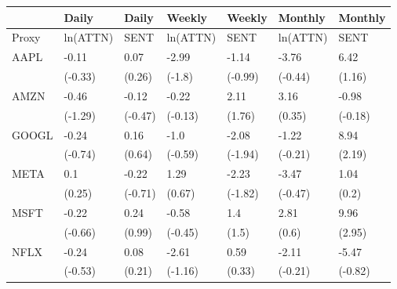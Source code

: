 \begin{tabular}{lllllll}
\toprule
{} &     Daily &    Daily &    Weekly &   Weekly &   Monthly &  Monthly \\
\midrule
Proxy &  ln(ATTN) &     SENT &  ln(ATTN) &     SENT &  ln(ATTN) &     SENT \\
AAPL  &     -0.11 &     0.07 &     -2.99 &    -1.14 &     -3.76 &     6.42 \\
      &   (-0.33) &   (0.26) &    (-1.8) &  (-0.99) &   (-0.44) &   (1.16) \\
AMZN  &     -0.46 &    -0.12 &     -0.22 &     2.11 &      3.16 &    -0.98 \\
      &   (-1.29) &  (-0.47) &   (-0.13) &   (1.76) &    (0.35) &  (-0.18) \\
GOOGL &     -0.24 &     0.16 &      -1.0 &    -2.08 &     -1.22 &     8.94 \\
      &   (-0.74) &   (0.64) &   (-0.59) &  (-1.94) &   (-0.21) &   (2.19) \\
META  &       0.1 &    -0.22 &      1.29 &    -2.23 &     -3.47 &     1.04 \\
      &    (0.25) &  (-0.71) &    (0.67) &  (-1.82) &   (-0.47) &    (0.2) \\
MSFT  &     -0.22 &     0.24 &     -0.58 &      1.4 &      2.81 &     9.96 \\
      &   (-0.66) &   (0.99) &   (-0.45) &    (1.5) &     (0.6) &   (2.95) \\
NFLX  &     -0.24 &     0.08 &     -2.61 &     0.59 &     -2.11 &    -5.47 \\
      &   (-0.53) &   (0.21) &   (-1.16) &   (0.33) &   (-0.21) &  (-0.82) \\
\bottomrule
\end{tabular}

